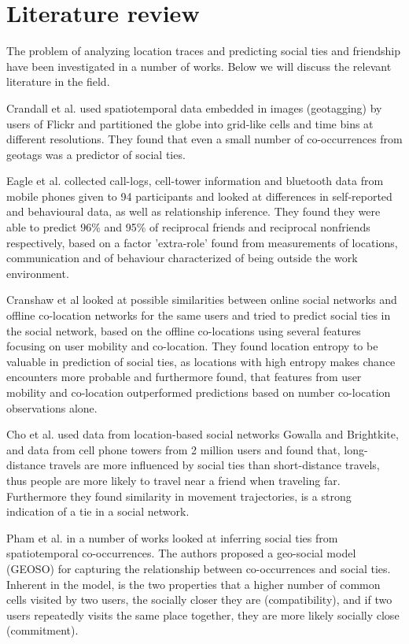\chapter{Literature review}
\label{chap:literature_review}
The problem of analyzing location traces and predicting social ties and friendship have been investigated in a number of works.
Below we will discuss the relevant literature in the field.

Crandall et al.\cite{crandall2010inferring} used spatiotemporal data embedded in images (geotagging) by users of Flickr and partitioned the globe into grid-like cells and time bins at different resolutions. They found that even a small number of co-occurrences from geotags was a predictor of social ties.

Eagle et al.\cite{eagle} collected call-logs, cell-tower information and bluetooth data from mobile phones given to 94 participants and looked at differences in self-reported and behavioural data, as well as relationship inference. They found they were able to predict 96\% and 95\% of reciprocal friends and reciprocal nonfriends respectively, based on a factor 'extra-role' found from measurements of locations, communication and of behaviour characterized of being outside the work environment.

Cranshaw et al\cite{cranshaw2010bridging} looked at possible similarities between online social networks and offline co-location networks for the same users and tried to predict social ties in the social network, based on the offline co-locations using several features focusing on user mobility and co-location. They found location entropy to be valuable in prediction of social ties, as locations with high entropy makes chance encounters more probable and furthermore found, that features from user mobility and co-location outperformed predictions based on number co-location observations alone.

Cho et al.\cite{FaMUMiLBSN} used data from location-based social networks Gowalla and Brightkite, and data from cell phone towers from 2 million users and found that, long-distance travels are more influenced by social ties than short-distance travels, thus people are more likely to travel near a friend when traveling far. Furthermore they found similarity in movement trajectories, is a strong indication of a tie in a social network.

Pham et al. in a number of works looked at inferring social ties from spatiotemporal co-occurrences\cite{pham2011towards}\cite{iRWRfSD}. The authors proposed a geo-social model (GEOSO) for capturing the relationship between co-occurrences and social ties. Inherent in the model, is the two properties that a higher number of common cells visited by two users, the socially closer they are (compatibility), and if two users repeatedly visits the same place together, they are more likely socially close (commitment).

